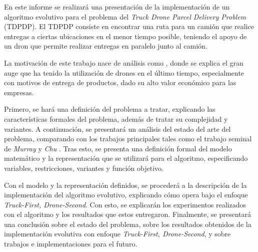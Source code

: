 



En este informe se realizará una presentación de la implementación de un algoritmo evolutivo para el problema del \textit{Truck Drone Parcel Delivery Problem} (TDPDP). El TDPDP consiste en encontrar una ruta para un camión que realice entregas a ciertas ubicaciones en el menor tiempo posible, teniendo el apoyo de un dron que permite realizar entregas en paralelo junto al camión.

La motivación de este trabajo nace de análisis como \cite{moshrefjavadi2021applications}, donde se explica el gran auge que ha tenido la utilización de drones en el último tiempo, especialmente con motivos de entrega de productos, dado su alto valor económico para las empresas.

Primero, se hará una definición del problema a tratar, explicando las características formales del problema, además de tratar su complejidad y variantes. A continuación, se presentará un análisis del estado del arte del problema, comparando con los trabajos principales tales como el trabajo seminal de \textit{Murray} y \textit{Chu} \cite{Murray2015Flying}. Tras esto, se presenta una definición formal del modelo matemático y la representación que se utilizará para el algoritmo, especificando variables, restricciones, variantes y función objetivo.

Con el modelo y la representación definidos, se procederá a la descripción de la implementación del algoritmo evolutivo, explicando cómo opera bajo el enfoque \textit{Truck-First, Drone-Second}. Con esto, se explicarán los experimentos realizados con el algoritmo y los resultados que estos entregaron. Finalmente, se presentará una conclusión sobre el estado del problema, sobre los resultados obtenidos de la implementación evolutiva con enfoque \textit{Truck-First, Drone-Second}, y sobre trabajos e implementaciones para el futuro.
